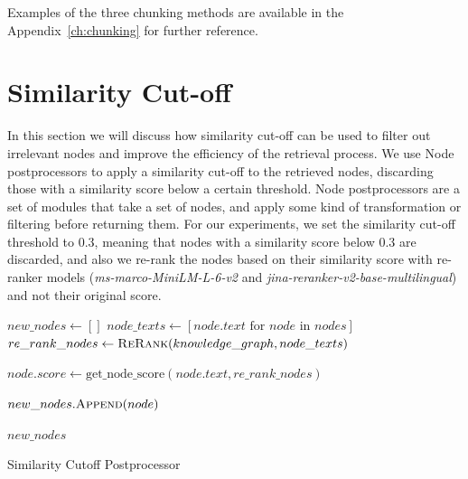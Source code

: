 Examples of the three chunking methods are available in the Appendix~\ref{ch:chunking} for further reference.


\section{Similarity Cut-off}\label{sec:similar-cut-off}
In this section we will discuss how similarity cut-off can be used to filter out irrelevant nodes and improve the efficiency of the retrieval process.
We use Node postprocessors to apply a similarity cut-off to the retrieved nodes, discarding those with a similarity score below a certain threshold.
Node postprocessors are a set of modules that take a set of nodes, and apply some kind of transformation or filtering before returning them.
For our experiments, we set the similarity cut-off threshold to 0.3, meaning that nodes with a similarity score below 0.3 are discarded, and also we re-rank the nodes based on their similarity score with re-ranker models (\textit{ms-marco-MiniLM-L-6-v2} and \textit{jina-reranker-v2-base-multilingual}) and not their original score.

\begin{algorithm}
    \begin{algorithmic}[1]
            \State $new\_nodes \gets []$
            \State $node\_texts \gets [node.text \text{ for } node \text{ in } nodes]$
            \State $re\_rank\_nodes \gets \textsc{ReRank}(knowledge\_graph, node\_texts)$

                \State $node.score \gets \text{get\_node\_score}(node.text, re\_rank\_nodes)$

                    \State $new\_nodes.\textsc{Append}(node)$
                \EndIf
            \EndFor

            \State \Return $new\_nodes$
        \EndProcedure
    \end{algorithmic}
    \caption{Similarity Cutoff Postprocessor}\label{alg:algorithm}
\end{algorithm}

